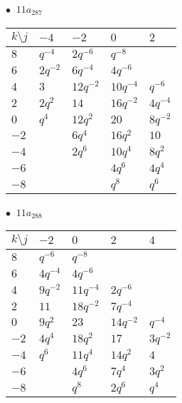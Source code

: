 \begin{minipage}{\linewidth}
$\bullet\ $ $11a_{287}$ \vspace{0.5em} \\
\begin{tabular}{l|llll}
$k \setminus j$ & $-4$ & $-2$ & $0$ & $2$ \\
\hline
$8$ & $q^{-4}$ & $2q^{-6}$ & $q^{-8}$ &  \\
$6$ & $2q^{-2}$ & $6q^{-4}$ & $4q^{-6}$ &  \\
$4$ & $3$ & $12q^{-2}$ & $10q^{-4}$ & $q^{-6}$ \\
$2$ & $2q^{2}$ & $14$ & $16q^{-2}$ & $4q^{-4}$ \\
$0$ & $q^{4}$ & $12q^{2}$ & $20$ & $8q^{-2}$ \\
$-2$ &  & $6q^{4}$ & $16q^{2}$ & $10$ \\
$-4$ &  & $2q^{6}$ & $10q^{4}$ & $8q^{2}$ \\
$-6$ &  &  & $4q^{6}$ & $4q^{4}$ \\
$-8$ &  &  & $q^{8}$ & $q^{6}$ \\
\end{tabular}
\vspace{2em}
\end{minipage}
%
\begin{minipage}{\linewidth}
$\bullet\ $ $11a_{288}$ \vspace{0.5em} \\
\begin{tabular}{l|llll}
$k \setminus j$ & $-2$ & $0$ & $2$ & $4$ \\
\hline
$8$ & $q^{-6}$ & $q^{-8}$ &  &  \\
$6$ & $4q^{-4}$ & $4q^{-6}$ &  &  \\
$4$ & $9q^{-2}$ & $11q^{-4}$ & $2q^{-6}$ &  \\
$2$ & $11$ & $18q^{-2}$ & $7q^{-4}$ &  \\
$0$ & $9q^{2}$ & $23$ & $14q^{-2}$ & $q^{-4}$ \\
$-2$ & $4q^{4}$ & $18q^{2}$ & $17$ & $3q^{-2}$ \\
$-4$ & $q^{6}$ & $11q^{4}$ & $14q^{2}$ & $4$ \\
$-6$ &  & $4q^{6}$ & $7q^{4}$ & $3q^{2}$ \\
$-8$ &  & $q^{8}$ & $2q^{6}$ & $q^{4}$ \\
\end{tabular}
\vspace{2em}
\end{minipage}
%
